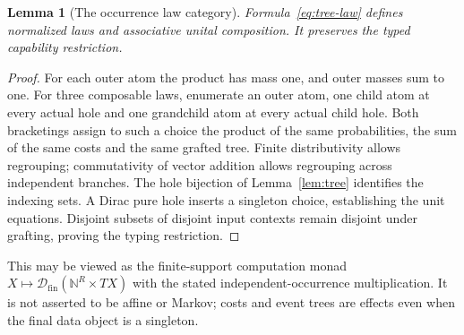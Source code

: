 \documentclass[11pt,a4paper]{article}
\newtheorem{lemma}[theorem]{Lemma}
\theoremstyle{definition}
\begin{document}
\begin{lemma}[The occurrence law category]\label{lem:law-category}
Formula~\eqref{eq:tree-law} defines normalized laws and associative unital
composition. It preserves the typed capability restriction.
\end{lemma}
\begin{proof}
For each outer atom the product has mass one, and outer masses sum to one.
For three composable laws, enumerate an outer atom, one child atom at every
actual hole and one grandchild atom at every actual child hole. Both
bracketings assign to such a choice the product of the same probabilities,
the sum of the same costs and the same grafted tree. Finite distributivity
allows regrouping; commutativity of vector addition allows regrouping across
independent branches. The hole bijection of Lemma~\ref{lem:tree} identifies
the indexing sets. A Dirac pure hole inserts a singleton choice, establishing
the unit equations. Disjoint subsets of disjoint input contexts remain
disjoint under grafting, proving the typing restriction.
\end{proof}
This may be viewed as the finite-support computation monad
$X\mapsto\mathcal D_{\mathrm{fin}}(\mathbb N^R\times TX)$ with the stated
independent-occurrence multiplication. It is not asserted to be affine or
Markov; costs and event trees are effects even when the final data object
is a singleton.
\end{document}
